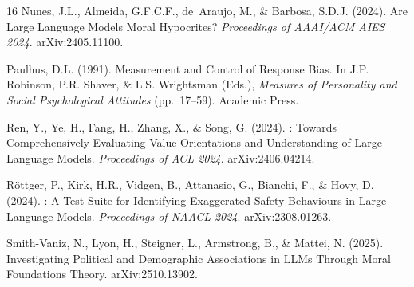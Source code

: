 \documentclass{article}
\begin{document}
\begin{thebibliography}{16}
Nunes, J.L., Almeida, G.F.C.F., de~Araujo, M., \& Barbosa, S.D.J. (2024).
\newblock Are Large Language Models Moral Hypocrites?
\newblock \emph{Proceedings of AAAI/ACM AIES 2024}. arXiv:2405.11100.

Paulhus, D.L. (1991).
\newblock Measurement and Control of Response Bias.
\newblock In J.P. Robinson, P.R. Shaver, \& L.S. Wrightsman (Eds.), \emph{Measures of Personality and Social Psychological Attitudes} (pp.\ 17--59). Academic Press.

Ren, Y., Ye, H., Fang, H., Zhang, X., \& Song, G. (2024).
: Towards Comprehensively Evaluating Value Orientations and Understanding of Large Language Models.
\newblock \emph{Proceedings of ACL 2024}. arXiv:2406.04214.

R{\"o}ttger, P., Kirk, H.R., Vidgen, B., Attanasio, G., Bianchi, F., \& Hovy, D. (2024).
: A Test Suite for Identifying Exaggerated Safety Behaviours in Large Language Models.
\newblock \emph{Proceedings of NAACL 2024}. arXiv:2308.01263.

Smith-Vaniz, N., Lyon, H., Steigner, L., Armstrong, B., \& Mattei, N. (2025).
\newblock Investigating Political and Demographic Associations in {LLMs} Through Moral Foundations Theory.
\newblock arXiv:2510.13902.

\end{thebibliography}

\newpage

\end{document}
